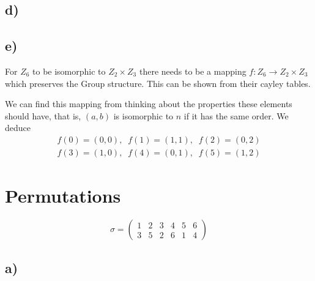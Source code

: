 \documentclass[]{scrartcl}
\begin{document}
\subsection{d)}




\subsection{e)}
For $Z_6$ to be isomorphic to $Z_2\times Z_3$ there needs to be a mapping $f:Z_6 \rightarrow Z_2\times Z_3$ which preserves the Group structure. This can be shown from their cayley tables.

We can find this mapping from thinking about the properties these elements should have, that is, $(a,b)$ is isomorphic to $n$ if it has the same order. We deduce
\begin{gather*}
	f(0) = (0,0),\;\; f(1) = (1,1), \;\; f(2) = (0,2)\\
	f(3) = (1,0),\;\; f(4) = (0,1), \;\; f(5) = (1,2)
\end{gather*}

\section{Permutations}

$$
\sigma = 
\begin{pmatrix}
	1 & 2 & 3 & 4 & 5 & 6\\
	3 & 5 & 2 & 6 & 1 & 4
\end{pmatrix}
$$
\subsection{a)}
\end{document}
